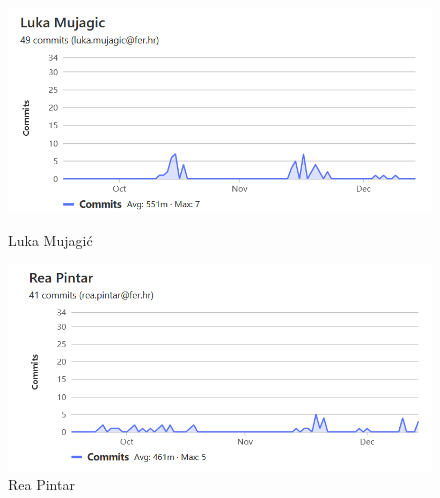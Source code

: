 		
		\begin{figure}[H]
			\begin{minipage}[t]{0.5\textwidth}
				\includegraphics[width=\linewidth]{slike/LMujagic.png}
				\caption{Luka Mujagić} \label{fig:Lmujagic}
			\end{minipage}
			\hspace*{\fill}
			\begin{minipage}[t]{0.5\textwidth}
				\includegraphics[width=\linewidth]{slike/RPintar.png}
				\caption{Rea Pintar} \label{fig:Rpintar}
			\end{minipage}
		\end{figure}


